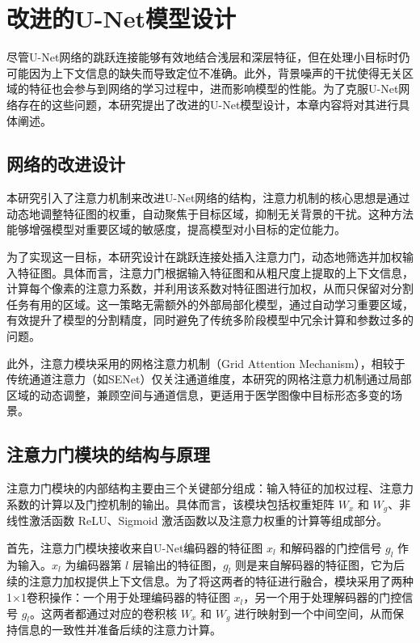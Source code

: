 \section{改进的U-Net模型设计}

尽管U-Net网络的跳跃连接能够有效地结合浅层和深层特征，但在处理小目标时仍可能因为上下文信息的缺失而导致定位不准确。此外，背景噪声的干扰使得无关区域的特征也会参与到网络的学习过程中，进而影响模型的性能。为了克服U-Net网络存在的这些问题，本研究提出了改进的U-Net模型设计，本章内容将对其进行具体阐述。

\subsection{网络的改进设计}

本研究引入了注意力机制来改进U-Net网络的结构，注意力机制的核心思想是通过动态地调整特征图的权重，自动聚焦于目标区域，抑制无关背景的干扰。这种方法能够增强模型对重要区域的敏感度，提高模型对小目标的定位能力。

为了实现这一目标，本研究设计在跳跃连接处插入注意力门，动态地筛选并加权输入特征图。具体而言，注意力门根据输入特征图和从粗尺度上提取的上下文信息，计算每个像素的注意力系数，并利用该系数对特征图进行加权，从而只保留对分割任务有用的区域。这一策略无需额外的外部局部化模型，通过自动学习重要区域，有效提升了模型的分割精度，同时避免了传统多阶段模型中冗余计算和参数过多的问题。

此外，注意力模块采用的网格注意力机制（Grid Attention Mechanism），相较于传统通道注意力（如SENet）仅关注通道维度，本研究的网格注意力机制通过局部区域的动态调整，兼顾空间与通道信息，更适用于医学图像中目标形态多变的场景。

\subsection{注意力门模块的结构与原理}

注意力门模块的内部结构主要由三个关键部分组成：输入特征的加权过程、注意力系数的计算以及门控机制的输出。具体而言，该模块包括权重矩阵 $W_x$ 和 $W_g$、非线性激活函数 ReLU、Sigmoid 激活函数以及注意力权重的计算等组成部分。

首先，注意力门模块接收来自U-Net编码器的特征图 $x_l$ 和解码器的门控信号 $g_l$ 作为输入。$x_l$ 为编码器第 $l$ 层输出的特征图，$g_l$ 则是来自解码器的特征图，它为后续的注意力加权提供上下文信息。为了将这两者的特征进行融合，模块采用了两种1×1卷积操作：一个用于处理编码器的特征图 $x_l$，另一个用于处理解码器的门控信号 $g_l$。这两者都通过对应的卷积核 $W_x$ 和 $W_g$ 进行映射到一个中间空间，从而保持信息的一致性并准备后续的注意力计算。

